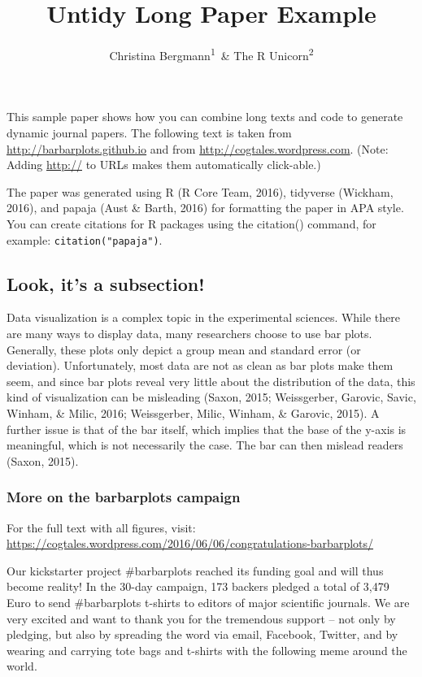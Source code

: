 \documentclass[english,floatsintext,man]{apa6}
\title{Untidy Long Paper Example}
\author{Christina Bergmann\textsuperscript{1}~\& The R Unicorn\textsuperscript{2}}
\affiliation{
    \vspace{0.5cm}
          \textsuperscript{1} Ecole Normale Superieure\\
          \textsuperscript{2} Institute for Rainbow Studies  }
\begin{document}
\maketitle

\setcounter{secnumdepth}{0}



This sample paper shows how you can combine long texts and code to
generate dynamic journal papers. The following text is taken from
\url{http://barbarplots.github.io} and from
\url{http://cogtales.wordpress.com}. (Note: Adding \url{http://} to URLs
makes them automatically click-able.)

The paper was generated using R (R Core Team, 2016), tidyverse (Wickham,
2016), and papaja (Aust \& Barth, 2016) for formatting the paper in APA
style. You can create citations for R packages using the citation()
command, for example: \texttt{citation("papaja")}.

\subsection{Look, it's a subsection!}\label{look-its-a-subsection}

Data visualization is a complex topic in the experimental sciences.
While there are many ways to display data, many researchers choose to
use bar plots. Generally, these plots only depict a group mean and
standard error (or deviation). Unfortunately, most data are not as clean
as bar plots make them seem, and since bar plots reveal very little
about the distribution of the data, this kind of visualization can be
misleading (Saxon, 2015; Weissgerber, Garovic, Savic, Winham, \& Milic,
2016; Weissgerber, Milic, Winham, \& Garovic, 2015). A further issue is
that of the bar itself, which implies that the base of the y-axis is
meaningful, which is not necessarily the case. The bar can then mislead
readers (Saxon, 2015).

\subsubsection{More on the barbarplots
campaign}\label{more-on-the-barbarplots-campaign}

For the full text with all figures, visit:
\url{https://cogtales.wordpress.com/2016/06/06/congratulations-barbarplots/}

Our kickstarter project \#barbarplots reached its funding goal and will
thus become reality! In the 30-day campaign, 173 backers pledged a total
of 3,479 Euro to send \#barbarplots t-shirts to editors of major
scientific journals. We are very excited and want to thank you for the
tremendous support -- not only by pledging, but also by spreading the
word via email, Facebook, Twitter, and by wearing and carrying tote bags
and t-shirts with the following meme around the world.
\end{document}
